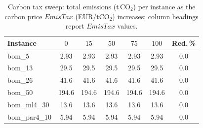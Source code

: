 \begin{table}[!htbp]\centering\scriptsize
\setlength{\tabcolsep}{3pt}
\caption{Carbon tax sweep: total emissions (t\,CO$_2$) per instance as the carbon price $EmisTax$ (EUR/tCO$_2$) increases; column headings report $EmisTax$ values.}\label{tab:tax}
\begin{tabular}{lcccccc}
\toprule
Instance & $0$ & $15$ & $50$ & $75$ & $100$ & Red.\,\%\\
\midrule
bom\_5 & 2.93 & 2.93 & 2.93 & 2.93 & 2.93 & 0.0 \\
bom\_13 & 29.5 & 29.5 & 29.5 & 29.5 & 29.5 & 0.0 \\
bom\_26 & 41.6 & 41.6 & 41.6 & 41.6 & 41.6 & 0.0 \\
bom\_50 & 194.6 & 194.6 & 194.6 & 194.6 & 194.6 & 0.0 \\
bom\_ml4\_30 & 13.6 & 13.6 & 13.6 & 13.6 & 13.6 & 0.0 \\
bom\_par4\_10 & 5.94 & 5.94 & 5.94 & 5.94 & 5.94 & 0.0 \\
\bottomrule
\end{tabular}
\end{table}
